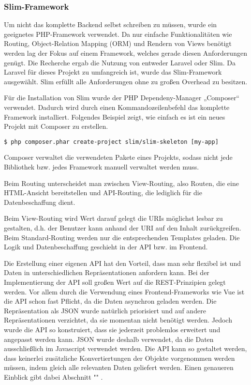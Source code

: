 \subsubsection{Slim-Framework}  
\label{sec:Slim-Framework-1}

Um nicht das komplette Backend selbst schreiben zu müssen, wurde ein geeignetes PHP-Framework verwendet. Da nur einfache Funktionalitäten wie Routing, Object-Relation Mapping (ORM) und Rendern von Views benötigt werden lag der Fokus auf einem Framework, welches gerade diesen Anforderungen genügt. Die Recherche ergab die Nutzung von entweder Laravel oder Slim. Da Laravel für dieses Projekt zu umfangreich ist, wurde das Slim-Framework ausgewählt. Slim erfüllt alle Anforderungen ohne zu großen Overhead zu besitzen. 

Für die Installation von Slim wurde der PHP Dependeny-Manager „Composer“ verwendet. Dadurch wird durch einen Kommandozeilenbefehl das komplette Framework installiert.
Folgendes Beispiel zeigt, wie einfach es ist ein neues Projekt mit Composer zu erstellen.
 
\begin{lstlisting}[frame=single] 
$ php composer.phar create-project slim/slim-skeleton [my-app]
\end{lstlisting}

Composer verwaltet die verwendeten Pakete eines Projekts, sodass nicht jede Bibliothek bzw. jedes Framework manuell verwaltet werden muss.	

Beim Routing unterscheidet man zwischen View-Routing, also Routen, die eine HTML-Ansicht bereitstellen und API-Routing, die lediglich für die Datenbeschaffung dient. 

Beim View-Routing wird Wert darauf gelegt die URIs möglichst lesbar zu gestalten, d.h. der Benutzer kann anhand der URI auf den Inhalt zurückgreifen. 
Beim Standard-Routing werden nur die entsprechenden Templates geladen. Die Logik und Datenbeschaffung geschieht in der API bzw. im Frontend.

Die Erstellung einer eigenen API hat den Vorteil, dass man sehr flexibel ist und Daten in unterschiedlichen Repräsentationen anfordern kann. Bei der Implementierung der API soll großen Wert auf die REST-Prinzipien gelegt werden. 
Vor allem durch die Verwendung eines Frontend-Frameworks wie Vue ist die API schon fast Pflicht, da die Daten asynchron geladen werden.
Die Repräsentation als JSON wurde natürlich priorisiert und auf andere Repräsentationen verzichtet, da sie momentan nicht benötigt werden. Jedoch wurde die API so konstruiert, dass sie jederzeit problemlos erweitert und angepasst werden kann. JSON wurde deshalb verwendet, da die Daten ausschließlich im Javascript verwendet werden. Die API kann so gestaltet werden, dass keinerlei zusätzliche Konvertiertungen der Objekte vorgenommen werden müssen, indem gleich alle relevanten Daten geliefert werden.
Einen genaueren Einblick gibt dabei Abschnitt "" .

